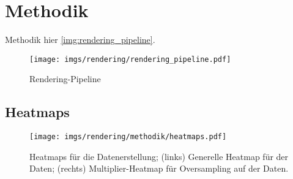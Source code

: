 
\section{Methodik}
\label{sec:daten:methodik}

Methodik hier \autoref{img:rendering_pipeline}.

\begin{figure}
    \centering
    \texttt{[image: imgs/rendering/rendering\_pipeline.pdf]}
    \caption{Rendering-Pipeline}
    \label{img:rendering_pipeline}
\end{figure}

\subsection{Heatmaps}
\label{sec:heatmaps}

\begin{figure}
    \centering
    \texttt{[image: imgs/rendering/methodik/heatmaps.pdf]}
    \caption{Heatmaps für die Datenerstellung; (links) Generelle Heatmap für  der Daten; (rechts) Multiplier-Heatmap für Oversampling auf  der Daten.}
    \label{img:heatmaps}
\end{figure}



